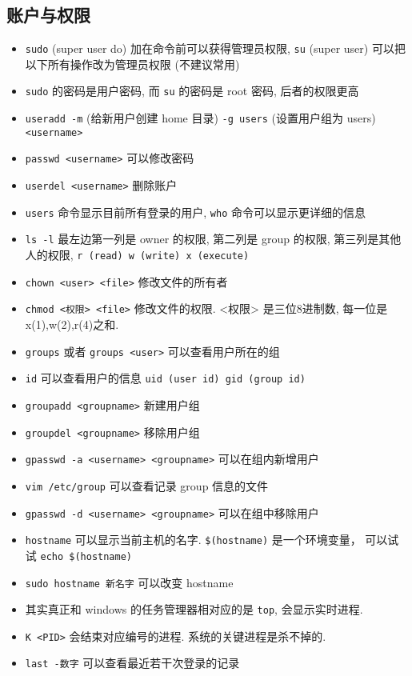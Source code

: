 \subsection{账户与权限}
\begin{itemize}
\item \verb`sudo` (super user do) 加在命令前可以获得管理员权限, \verb`su` (super user) 可以把以下所有操作改为管理员权限 (不建议常用)
\item \verb`sudo` 的密码是用户密码, 而 \verb`su` 的密码是 root 密码, 后者的权限更高
\item \verb`useradd -m` (给新用户创建 home 目录) \verb`-g users` (设置用户组为 users) \verb`<username>`
\item \verb`passwd <username>` 可以修改密码
\item \verb`userdel <username>` 删除账户
\item \verb`users` 命令显示目前所有登录的用户, \verb`who` 命令可以显示更详细的信息
\item \verb`ls -l` 最左边第一列是 owner 的权限, 第二列是 group 的权限, 第三列是其他人的权限, \verb`r (read) w (write) x (execute)`
\item \verb`chown <user> <file>` 修改文件的所有者
\item \verb`chmod <权限> <file>` 修改文件的权限. <权限> 是三位8进制数, 每一位是 x(1),w(2),r(4)之和.
\item \verb`groups` 或者 \verb`groups <user>` 可以查看用户所在的组
\item \verb`id` 可以查看用户的信息 \verb`uid (user id) gid (group id)`
\item \verb`groupadd <groupname>` 新建用户组
\item \verb`groupdel <groupname>` 移除用户组
\item \verb`gpasswd -a <username> <groupname>` 可以在组内新增用户
\item \verb`vim /etc/group` 可以查看记录 group 信息的文件
\item \verb`gpasswd -d <username> <groupname>` 可以在组中移除用户
\item \verb`hostname` 可以显示当前主机的名字. \verb`$(hostname)` 是一个环境变量， 可以试试 \verb`echo $(hostname)`
\item \verb|sudo hostname 新名字| 可以改变 hostname
\item 其实真正和 windows 的任务管理器相对应的是 \verb`top`, 会显示实时进程. 
\item \verb`K <PID>` 会结束对应编号的进程. 系统的关键进程是杀不掉的.
\item \verb`last -数字` 可以查看最近若干次登录的记录
\end{itemize}

